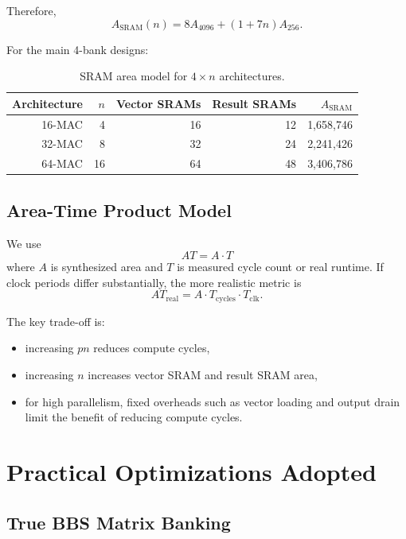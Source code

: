 \documentclass[11pt,a4paper]{article}
\begin{document}
Therefore,
\begin{equation}
    A_{\mathrm{SRAM}}(n) = 8A_{4096} + (1 + 7n)A_{256}.
\end{equation}

For the main 4-bank designs:
\begin{table}[H]
\centering
\caption{SRAM area model for $4 \times n$ architectures.}
\begin{tabular}{rrrrr}
\toprule
Architecture & $n$ & Vector SRAMs & Result SRAMs & $A_{\mathrm{SRAM}}$ \\
\midrule
16-MAC & 4  & 16 & 12 & 1,658,746 \\
32-MAC & 8  & 32 & 24 & 2,241,426 \\
64-MAC & 16 & 64 & 48 & 3,406,786 \\
\bottomrule
\end{tabular}
\end{table}

\subsection{Area-Time Product Model}

We use
\begin{equation}
    AT = A \cdot T
\end{equation}
where $A$ is synthesized area and $T$ is measured cycle count or real runtime. If clock periods differ substantially, the more realistic metric is
\begin{equation}
    AT_{\mathrm{real}} = A \cdot T_{\mathrm{cycles}} \cdot T_{\mathrm{clk}}.
\end{equation}

The key trade-off is:
\begin{itemize}[nosep]
    \item increasing $pn$ reduces compute cycles,
    \item increasing $n$ increases vector SRAM and result SRAM area,
    \item for high parallelism, fixed overheads such as vector loading and output drain limit the benefit of reducing compute cycles.
\end{itemize}

\section{Practical Optimizations Adopted}

\subsection{True BBS Matrix Banking}
\end{document}
